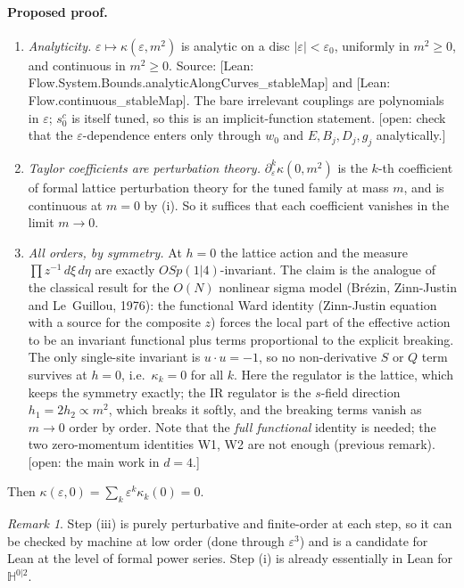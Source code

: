 \documentclass[11pt]{article}
\theoremstyle{definition}
\theoremstyle{remark}
\newtheorem{remark}[theorem]{Remark}
\newcommand{\HH}{\mathbb{H}}
\newcommand{\eps}{\varepsilon}
\newcommand{\lean}[1]{\textsf{[Lean: #1]}}
\newcommand{\open}[1]{\textcolor{red!60!black}{\textsf{[open: #1]}}}
\begin{document}
\paragraph{Proposed proof.}
\begin{enumerate}[label=(\roman*)]
\item \emph{Analyticity.} $\eps\mapsto\kappa(\eps,m^2)$ is analytic on a disc
  $|\eps|<\eps_0$, uniformly in $m^2\ge0$, and continuous in $m^2\ge0$. Source:
  \lean{Flow.System.Bounds.analyticAlongCurves\_stableMap} and
  \lean{Flow.continuous\_stableMap}. The bare irrelevant couplings are polynomials in $\eps$;
  $s_0^c$ is itself tuned, so this is an implicit-function statement.
  \open{check that the $\eps$-dependence enters only through $w_0$ and $E,B_j,D_j,g_j$
  analytically.}
\item \emph{Taylor coefficients are perturbation theory.} $\partial_\eps^k\kappa(0,m^2)$ is
  the $k$-th coefficient of formal lattice perturbation theory for the tuned family at mass
  $m$, and is continuous at $m=0$ by (i). So it suffices that each coefficient vanishes in
  the limit $m\to0$.
\item \emph{All orders, by symmetry.} At $h=0$ the lattice action and the measure
  $\prod z^{-1}\,d\xi\,d\eta$ are exactly $OSp(1|4)$-invariant. The claim is the analogue of
  the classical result for the $O(N)$ nonlinear sigma model (Br\'ezin, Zinn-Justin and
  Le~Guillou, 1976): the functional Ward identity (Zinn-Justin equation with a source for
  the composite $z$) forces the local part of the effective action to be an invariant
  functional plus terms proportional to the explicit breaking. The only single-site
  invariant is $u\cdot u=-1$, so no non-derivative $S$ or $Q$ term survives at $h=0$, i.e.\
  $\kappa_k=0$ for all $k$. Here the regulator is the lattice, which keeps the symmetry
  exactly; the IR regulator is the $s$-field direction $h_1=2h_2\propto m^2$, which breaks
  it softly, and the breaking terms vanish as $m\to0$ order by order. Note that the
  \emph{full functional} identity is needed; the two zero-momentum identities W1, W2 are
  not enough (previous remark). \open{the main work in $d=4$.}
\end{enumerate}
Then $\kappa(\eps,0)=\sum_k\eps^k\kappa_k(0)=0$.

\begin{remark}
  Step (iii) is purely perturbative and finite-order at each step, so it can be checked
  by machine at low order (done through $\eps^3$) and is a candidate for Lean at the level
  of formal power series. Step (i) is already essentially in Lean for $\HH^{0|2}$.
\end{remark}
\end{document}
